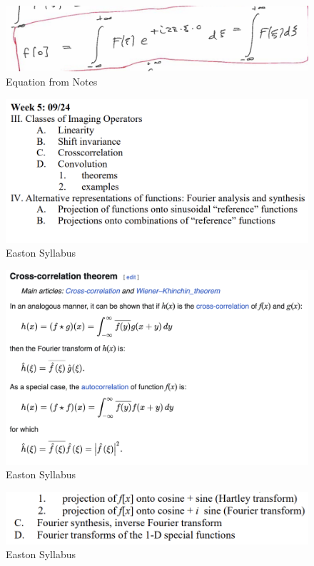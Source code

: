 \documentclass{article}
\begin{document}
\begin{figure}[h!]
\centering
\includegraphics[scale=.65]{Fourier/Week 4/Notes/Formula.png}
\caption{Equation from Notes}
\label{fig:Ordinate}
\end{figure}


\begin{figure}[h!]
\centering
\includegraphics[scale=.65]{Fourier/Week 5/Week5.1.png}
\caption{Easton Syllabus}
\label{fig:Syllabus}
\end{figure}

\begin{figure}[h!]
\centering
\includegraphics[scale=.65]{Fourier/Week 5/Cross-Correlation_Theorem.png}
\caption{Easton Syllabus}
\label{fig:Syllabus}
\end{figure}


\begin{figure}[h!]
\centering
\includegraphics[scale=.65]{Fourier/Week 5/Week5.2.png}
\caption{Easton Syllabus}
\label{fig:Syllabus5}
\end{figure}
\end{document}
